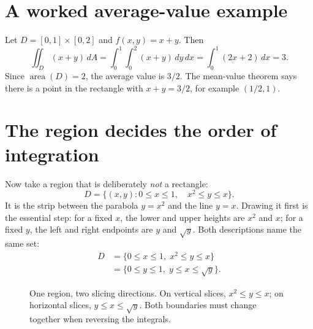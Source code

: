 \section{A worked average-value example}

\begin{example}
Let \(D=[0,1]\times[0,2]\) and \(f(x,y)=x+y\).  Then
\[
  \iint_D(x+y)\,dA
  =\int_0^1\int_0^2(x+y)\,dy\,dx
  =\int_0^1(2x+2)\,dx=3.
\]
Since \(\operatorname{area}(D)=2\), the average value is \(3/2\).  The mean-value theorem says there is a point in the rectangle with \(x+y=3/2\), for example \((1/2,1)\).
\end{example}

\section{The region decides the order of integration}

Now take a region that is deliberately \emph{not} a rectangle:
\[
 D=\{(x,y):0\le x\le1,\quad x^2\le y\le x\}.
\]
It is the strip between the parabola $y=x^2$ and the line $y=x$. Drawing it first is the essential step: for a fixed $x$, the lower and upper heights are $x^2$ and $x$; for a fixed $y$, the left and right endpoints are $y$ and $\sqrt y$. Both descriptions name the same set:
\[
 \begin{aligned}
 D&=\{0\le x\le1,\;x^2\le y\le x\}\\
  &=\{0\le y\le1,\;y\le x\le\sqrt y\}.
 \end{aligned}
\]

\begin{figure}[H]
\centering
{}
\caption{One region, two slicing directions. On vertical slices, $x^2\le y\le x$; on horizontal slices, $y\le x\le\sqrt y$. Both boundaries must change together when reversing the integrals.}
\end{figure}

